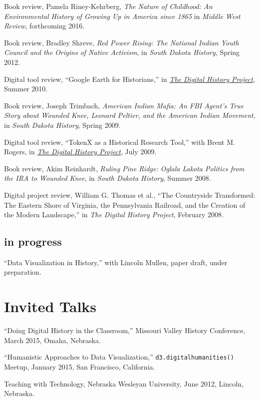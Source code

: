 Book review, Pamela Riney-Kehrberg, \emph{The Nature of Childhood: An
Environmental History of Growing Up in America since 1865} in
\emph{Middle West Review}, forthcoming 2016.

Book review, Bradley Shreve, \emph{Red Power Rising: The National Indian
Youth Council and the Origins of Native Activism}, in \emph{South Dakota
History}, Spring 2012.

Digital tool review, ``Google Earth for Historians,'' in
\emph{\href{http://digitalhistory.unl.edu/t-reviews/geheppler.php}{The
Digital History Project}}, Summer 2010.

Book review, Joseph Trimbach, \emph{American Indian Mafia: An FBI
Agent's True Story about Wounded Knee, Leonard Peltier, and the American
Indian Movement}, in \emph{South Dakota History}, Spring 2009.

Digital tool review, ``TokenX as a Historical Research Tool,'' with
Brent M. Rogers, in
\emph{\href{http://digitalhistory.unl.edu/t-reviews/tokenxhepplerrogers.php}{The
Digital History Project}}, July 2009.

Book review, Akim Reinhardt, \emph{Ruling Pine Ridge: Oglala Lakota
Politics from the IRA to Wounded Knee}, in \emph{South Dakota History},
Summer 2008.

Digital project review, William G. Thomas et al., ``The Countryside
Transformed: The Eastern Shore of Virginia, the Pennsylvania Railroad,
and the Creation of the Modern Landscape,'' in \emph{The Digital History
Project}, February 2008.

\subsection{in progress}\label{in-progress}

``Data Visualization in History,'' with Lincoln Mullen, paper draft,
under preparation.

\section{Invited Talks}\label{invited-talks}

``Doing Digital History in the Classroom,'' Missouri Valley History
Conference, March 2015, Omaha, Nebraska.

``Humanistic Approaches to Data Visualization,''
\texttt{d3.digitalhumanities()} Meetup, January 2015, San Francisco,
California.

Teaching with Technology, Nebraska Wesleyan University, June 2012,
Lincoln, Nebraska.

